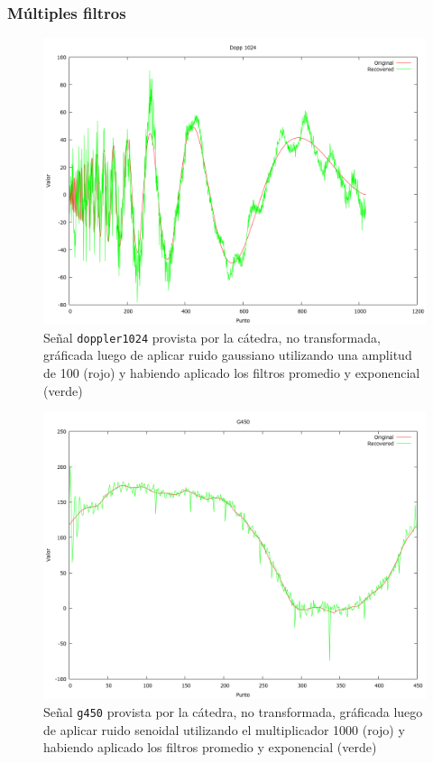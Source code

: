 \subsubsection{M\'ultiples filtros}

\begin{figure}[H]
\begin {center}
\includegraphics[width=500pt]{imagenes/dopp1024-gauss100-both.png}
\end {center}
\caption{Se\~nal \texttt{doppler1024} provista por la c\'atedra, no transformada, gr\'aficada
luego de aplicar ruido gaussiano utilizando una amplitud de 100 (rojo) y 
habiendo aplicado los filtros promedio y exponencial (verde)}
\label{fig:dopcomb}
\end{figure}

\begin{figure}[H]
\begin {center}
\includegraphics[width=500pt]{imagenes/g450-sin100-both.png}
\end {center}
\caption{Se\~nal \texttt{g450} provista por la c\'atedra, no transformada, gr\'aficada
luego de aplicar ruido senoidal utilizando el multiplicador 1000 (rojo) y 
habiendo aplicado los filtros promedio y exponencial (verde)}
\label{fig:gcomb}
\end{figure}

